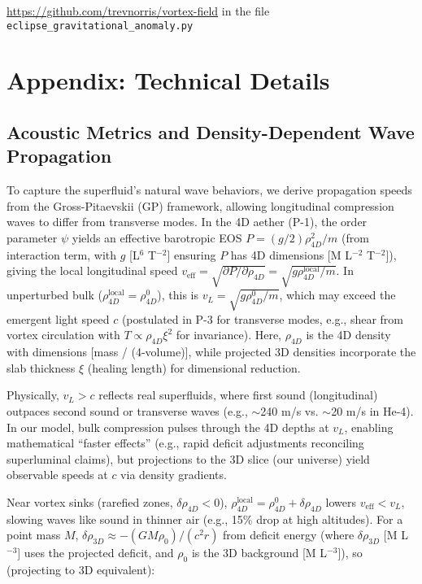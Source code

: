 \documentclass{article}
\begin{document}
\noindent\url{https://github.com/trevnorris/vortex-field} in the file \verb|eclipse_gravitational_anomaly.py|


\section{Appendix: Technical Details}

\subsection{Acoustic Metrics and Density-Dependent Wave Propagation}

To capture the superfluid's natural wave behaviors, we derive propagation speeds from the Gross-Pitaevskii (GP) framework, allowing longitudinal compression waves to differ from transverse modes. In the 4D aether (P-1), the order parameter $\psi$ yields an effective barotropic EOS $P = (g / 2) \rho_{4D}^2 / m$ (from interaction term, with $g$ [L$^6$ T$^{-2}$] ensuring $P$ has 4D dimensions [M L$^{-2}$ T$^{-2}$]), giving the local longitudinal speed $v_{\text{eff}} = \sqrt{\partial P / \partial \rho_{4D}} = \sqrt{g \rho_{4D}^{\text{local}} / m}$. In unperturbed bulk ($\rho_{4D}^{\text{local}} = \rho_{4D}^0$), this is $v_L = \sqrt{g \rho_{4D}^0 / m}$, which may exceed the emergent light speed $c$ (postulated in P-3 for transverse modes, e.g., shear from vortex circulation with $T \propto \rho_{4D} \xi^2$ for invariance). Here, $\rho_{4D}$ is the 4D density with dimensions [mass / (4-volume)], while projected 3D densities incorporate the slab thickness $\xi$ (healing length) for dimensional reduction.

Physically, $v_L > c$ reflects real superfluids, where first sound (longitudinal) outpaces second sound or transverse waves (e.g., $\sim$240 m/s vs. $\sim$20 m/s in He-4). In our model, bulk compression pulses through the 4D depths at $v_L$, enabling mathematical ``faster effects'' (e.g., rapid deficit adjustments reconciling superluminal claims), but projections to the 3D slice (our universe) yield observable speeds at $c$ via density gradients.

Near vortex sinks (rarefied zones, $\delta \rho_{4D} < 0$), $\rho_{4D}^{\text{local}} = \rho_{4D}^0 + \delta \rho_{4D}$ lowers $v_{\text{eff}} < v_L$, slowing waves like sound in thinner air (e.g., 15\% drop at high altitudes). For a point mass $M$, $\delta \rho_{3D} \approx - (G M \rho_0) / (c^2 r)$ from deficit energy (where $\delta \rho_{3D}$ [M L$^{-3}$] uses the projected deficit, and $\rho_0$ is the 3D background [M L$^{-3}$]), so (projecting to 3D equivalent):
\end{document}
